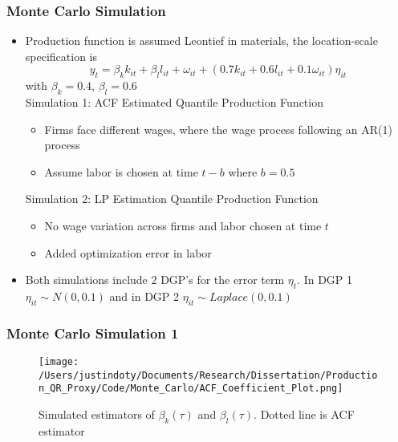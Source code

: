 \documentclass{beamer}
\begin{document}

\begin{frame}
\frametitle{Monte Carlo Simulation}
\begin{itemize}
	\item Production function is assumed Leontief in materials, the location-scale specification is
	\begin{equation}
		y_{t}=\beta_{k}k_{it}+\beta_{l}l_{it}+\omega_{it}+(0.7k_{it}+0.6l_{it}+0.1\omega_{it})\eta_{it}
	\end{equation}
	with $\beta_{k}=0.4$, $\beta_{l}=0.6$\\
	Simulation 1: ACF Estimated Quantile Production Function
	\begin{itemize}
		\item Firms face different wages, where the wage process following an AR(1) process
		\item Assume labor is chosen at time $t-b$ where $b=0.5$
	\end{itemize}
	Simulation 2: LP Estimation Quantile Production Function
	\begin{itemize}
		\item No wage variation across firms and labor chosen at time $t$
		\item Added optimization error in labor
	\end{itemize}
	\item Both simulations include 2 DGP's for the error term $\eta_{t}$. In DGP 1 $\eta_{it} \sim N(0,0.1)$ and in DGP 2 $\eta_{it} \sim \textit{Laplace}(0,0.1)$
\end{itemize}
\end{frame}


\begin{frame}
\frametitle{Monte Carlo Simulation 1}
\begin{figure}[H]
\centering
\caption{Simulated estimators of $\beta_{k}(\tau)$ and $\beta_{l}(\tau)$. Dotted line is ACF estimator}
\texttt{[image: /Users/justindoty/Documents/Research/Dissertation/Production\_QR\_Proxy/Code/Monte\_Carlo/ACF\_Coefficient\_Plot.png]}
\end{figure}
\end{frame}

\end{document}
